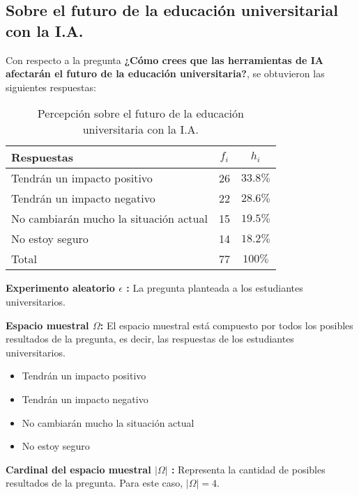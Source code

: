 \subsection{Sobre el futuro de la educación universitarial con la I.A.}

Con respecto a la pregunta \textbf{¿Cómo crees que las herramientas de IA afectarán el futuro de la educación universitaria?}, se obtuvieron las siguientes respuestas:


\begin{table}[H]
  \centering
  \renewcommand{\arraystretch}{1.5}
  \begin{tabular}{l c c }
    \hline
    Respuestas & \(f_i\) & \(h_i\) \\
    \hline
    Tendrán un impacto positivo & 26 & \(33.8\%\) \\
    Tendrán un impacto negativo & 22 & \(28.6\%\) \\
    No cambiarán mucho la situación actual & 15 & \(19.5\%\) \\
    No estoy seguro & 14 & \(18.2\%\) \\
    \hline
    Total & 77 & \(100\%\) \\
  \end{tabular}
  \caption{Percepción sobre el futuro de la educación universitaria con la I.A.}
  \label{tabla:futuroIA}
\end{table}

\textbf{Experimento aleatorio \(\epsilon\) :} La pregunta planteada a los estudiantes universitarios.

\textbf{Espacio muestral \(\Omega\):} El espacio muestral está compuesto por todos los posibles resultados de la pregunta, es decir, las respuestas de los estudiantes universitarios.

\begin{itemize}
  \item Tendrán un impacto positivo
  \item Tendrán un impacto negativo
  \item No cambiarán mucho la situación actual
  \item No estoy seguro
\end{itemize}

\textbf{Cardinal del espacio muestral $|\Omega|$ :} Representa la cantidad de posibles resultados de la pregunta. Para este caso, \(|\Omega| = 4\).

